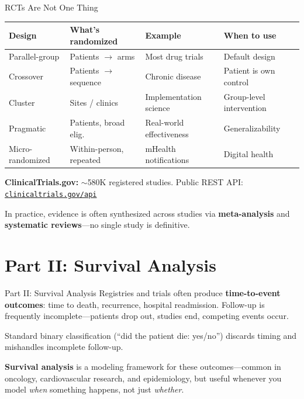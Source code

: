 \documentclass[aspectratio=169,10pt]{beamer}
\begin{document}
\begin{frame}{RCTs Are Not One Thing}
\begin{center}
{\small
\renewcommand{\arraystretch}{1.15}
\begin{tabular}{p{2.5cm}p{2.8cm}p{3cm}p{2.8cm}}
\toprule
\textbf{Design} & \textbf{What's randomized} & \textbf{Example} & \textbf{When to use} \\
\midrule
Parallel-group & Patients $\to$ arms & Most drug trials & Default design \\
Crossover & Patients $\to$ sequence & Chronic disease & Patient is own control \\
Cluster & Sites / clinics & Implementation science & Group-level intervention \\
Pragmatic & Patients, broad elig. & Real-world effectiveness & Generalizability \\
Micro-randomized & Within-person, repeated & mHealth notifications & Digital health \\
\bottomrule
\end{tabular}
}
\end{center}

\vspace{0.1em}
\pause
{\small \textbf{ClinicalTrials.gov:} $\sim$580K registered studies. Public REST API: \href{https://clinicaltrials.gov/api}{\texttt{clinicaltrials.gov/api}}}

\vspace{0.1em}
{\small In practice, evidence is often synthesized across studies via \textbf{meta-analysis} and \textbf{systematic reviews}---no single study is definitive.}
\end{frame}

\section{Part II: Survival Analysis}

\begin{frame}{Part II: Survival Analysis}
Registries and trials often produce \textbf{time-to-event outcomes}: time to death, recurrence, hospital readmission. Follow-up is frequently incomplete---patients drop out, studies end, competing events occur.

\vspace{0.3em}
Standard binary classification (``did the patient die: yes/no'') discards timing and mishandles incomplete follow-up.

\vspace{0.3em}
\textbf{Survival analysis} is a modeling framework for these outcomes---common in oncology, cardiovascular research, and epidemiology, but useful whenever you model \emph{when} something happens, not just \emph{whether}.
\end{frame}
\end{document}
